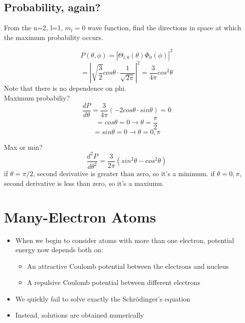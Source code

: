 \documentclass[class=article,crop=false]{standalone}
\begin{document}
\subsection{Probability, again?}

\begin{question}[Example]
	From the n=2, l=1, $m_l = 0$ wave function, find the directions in space at which the maximum probability occurs.

	\begin{answer}[Answer]
		$$ P(\theta, \phi) = |\Theta_{l, 0}(\theta) \Phi_0(\phi)|^2 $$
		$$ = | \sqrt{\frac{3}{2}} cos \theta \cdot \frac{1}{\sqrt{2\pi}} |^2 = \frac{3}{4\pi}cos^2\theta $$
		Note that there is no dependence on phi. \\
		Maximum probabiliy?
		$$\frac{dP}{d\theta} = \frac{3}{4\pi}(-2 cos\theta \cdot sin \theta) = 0 $$
		$$ =  cos\theta = 0 \rightarrow \theta = \frac{\pi}{2} $$
		$$ =  sin\theta = 0 \rightarrow \theta = 0, \pi $$

		Max or min?
		$$ \frac{d^2P}{d\theta^2} = \frac{3}{2\pi} (sin^2\theta - cos^2\theta) $$
		if $\theta = \pi/2$, second derivative is greater than zero, so it's a minimum.
		if $\theta = 0, \pi$, second derivative is less than zero, so it's a maxiumu.
	\end{answer}
\end{question}

\section{Many-Electron Atoms}
\begin{itemize}
	\item When we begin to consider atoms with more than one electron, potential energy now depends both on:
	\begin{itemize}
		\item An attractive Coulomb potential between the electrons and nucleus
		\item A repulsive Coulomb potential between different electrons
	\end{itemize}
	\item We quickly fail to solve exactly the Schrödinger's equation
	\item Instead, solutions are obtained numerically
\end{itemize}
\end{document}
